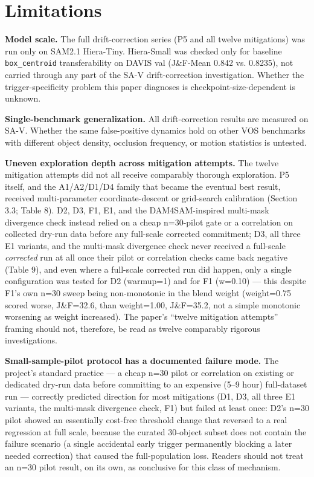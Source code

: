 \documentclass[11pt]{article}
\begin{document}
\section{Limitations}

\textbf{Model scale.} The full drift-correction series (P5 and all twelve mitigations) was run only on SAM2.1 Hiera-Tiny. Hiera-Small was checked only for baseline \texttt{box\_centroid} transferability on DAVIS val (J\&F-Mean 0.842 vs. 0.8235), not carried through any part of the SA-V drift-correction investigation. Whether the trigger-specificity problem this paper diagnoses is checkpoint-size-dependent is unknown.

\textbf{Single-benchmark generalization.} All drift-correction results are measured on SA-V. Whether the same false-positive dynamics hold on other VOS benchmarks with different object density, occlusion frequency, or motion statistics is untested.

\textbf{Uneven exploration depth across mitigation attempts.} The twelve mitigation attempts did not all receive comparably thorough exploration. P5 itself, and the A1/A2/D1/D4 family that became the eventual best result, received multi-parameter coordinate-descent or grid-search calibration (Section 3.3; Table 8). D2, D3, F1, E1, and the DAM4SAM-inspired multi-mask divergence check instead relied on a cheap n=30-pilot gate or a correlation on collected dry-run data before any full-scale corrected commitment; D3, all three E1 variants, and the multi-mask divergence check never received a full-scale \emph{corrected} run at all once their pilot or correlation checks came back negative (Table 9), and even where a full-scale corrected run did happen, only a single configuration was tested for D2 (warmup=1) and for F1 (w=0.10) — this despite F1's own n=30 sweep being non-monotonic in the blend weight (weight=0.75 scored worse, J\&F=32.6, than weight=1.00, J\&F=35.2, not a simple monotonic worsening as weight increased). The paper's ``twelve mitigation attempts'' framing should not, therefore, be read as twelve comparably rigorous investigations.

\textbf{Small-sample-pilot protocol has a documented failure mode.} The project's standard practice — a cheap n=30 pilot or correlation on existing or dedicated dry-run data before committing to an expensive (5–9 hour) full-dataset run — correctly predicted direction for most mitigations (D1, D3, all three E1 variants, the multi-mask divergence check, F1) but failed at least once: D2's n=30 pilot showed an essentially cost-free threshold change that reversed to a real regression at full scale, because the curated 30-object subset does not contain the failure scenario (a single accidental early trigger permanently blocking a later needed correction) that caused the full-population loss. Readers should not treat an n=30 pilot result, on its own, as conclusive for this class of mechanism.
\end{document}
